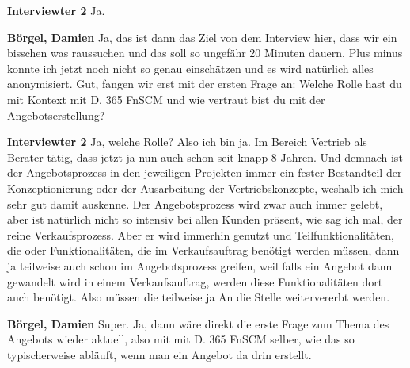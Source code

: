 \textbf{Interviewter 2}\newline
Ja.

\textbf{Börgel, Damien}\newline
Ja, das ist dann das Ziel von dem Interview hier, dass wir ein bisschen was raussuchen und das soll so ungefähr 20 Minuten dauern. Plus minus konnte ich jetzt noch nicht so genau einschätzen und es wird natürlich alles anonymisiert.
Gut, fangen wir erst mit der ersten Frage an: Welche Rolle hast du mit Kontext mit D. 365 FnSCM und wie vertraut bist du mit der Angebotserstellung?

\textbf{Interviewter 2}\newline
Ja, welche Rolle? Also ich bin ja.
Im Bereich Vertrieb als Berater tätig, dass jetzt ja nun auch schon seit knapp 8 Jahren.
Und demnach ist der Angebotsprozess in den jeweiligen Projekten immer ein fester Bestandteil der Konzeptionierung oder der Ausarbeitung der Vertriebskonzepte, weshalb ich mich sehr gut damit auskenne. Der Angebotsprozess wird zwar auch immer gelebt, aber ist natürlich nicht so intensiv bei allen Kunden präsent, wie sag ich mal, der reine Verkaufsprozess. Aber er wird immerhin genutzt und Teilfunktionalitäten, die oder Funktionalitäten, die im Verkaufsauftrag
benötigt werden müssen, dann ja teilweise auch schon im Angebotsprozess greifen, weil falls ein Angebot dann gewandelt wird in einem Verkaufsauftrag, werden diese Funktionalitäten dort auch benötigt. Also müssen die teilweise ja
An die Stelle weitervererbt werden.

\textbf{Börgel, Damien}\newline
Super.
Ja, dann wäre direkt die erste Frage zum Thema des Angebots wieder aktuell, also mit mit D. 365 FnSCM selber, wie das so typischerweise abläuft, wenn man ein Angebot da drin erstellt.

